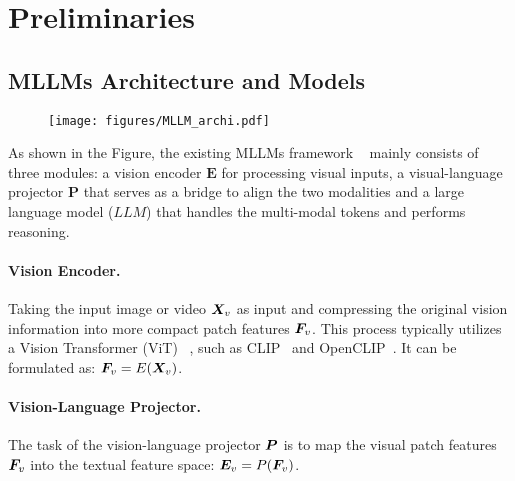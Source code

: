 \vspace{-2mm}
\section{Preliminaries}
\vspace{-2mm}
\subsection{MLLMs Architecture and Models}
\vspace{-2mm}
\begin{wrapfigure}{r}{3.5cm}
  \vspace{-6mm}
    \texttt{[image: figures/MLLM\_archi.pdf]}
  \label{fig:MLLM_archi}
  \vspace{-9mm}
\end{wrapfigure}
As shown in the Figure, the existing MLLMs framework ~\citep{qwenvl,chen2024internvl} mainly consists of three modules: a vision encoder $\textbf{E}$ for processing visual inputs, a visual-language projector $\textbf{P}$ that serves as a bridge to align the two modalities and a large language model ($LLM$) that handles the multi-modal tokens and performs reasoning. 
\vspace{-4mm}
\paragraph{Vision Encoder.} Taking the input image or video $\boldsymbol{X}_v$ as input and compressing the original vision information into more compact patch features $\boldsymbol{F}_v$. This process typically utilizes a Vision Transformer (ViT) ~\citep{vit}, such as CLIP~\citep{radford2021clip} and OpenCLIP~\citep{openclip}. It can be formulated as: $\boldsymbol{F}_v = E(\boldsymbol{X}_v)$.



\vspace{-4mm}
\paragraph{Vision-Language Projector.} The task of the vision-language projector $\boldsymbol{P}$ is to map the visual patch features $\boldsymbol{F}_v$ into the textual feature space: $\boldsymbol{E}_v = P(\boldsymbol{F}_v)$.
\vspace{-4mm}
